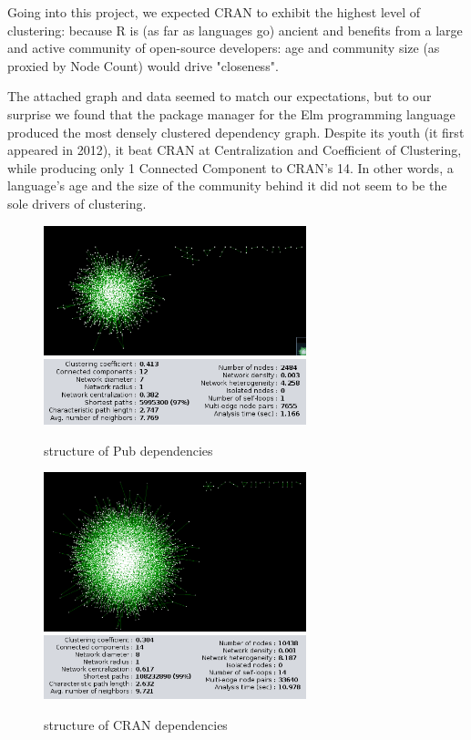 \documentclass[letterpaper, 10 pt, conference]{ieeeconf}  %
\begin{document}
Going into this project, we expected CRAN to exhibit the highest level of clustering:
	because R is (as far as languages go) ancient
    and benefits from a large and active community of open-source developers: 
    age and community size (as proxied by Node Count) would drive "closeness".

The attached graph and data seemed to match our expectations, 
	but to our surprise we found that the package manager for the Elm programming language 
	produced the most densely clustered dependency graph. 
    Despite its youth (it first appeared in 2012),
    it beat CRAN at Centralization and Coefficient of Clustering, 
    while producing only 1 Connected Component to CRAN's 14.
    In other words, a language's age and the size of the community behind it
    did not seem to be the sole drivers of clustering.

\begin{figure} %
\centering
\includegraphics[width=3in]{images/Pub_Graph.png}
\includegraphics[width=3in]{images/Pub_Params_Screenshot.png}
\caption{\label{Pub_Graph} structure of Pub dependencies}
\end{figure}

\begin{figure} %
\centering
\includegraphics[width=3in]{images/CRAN_Graph.png}
\includegraphics[width=3in]{images/CRAN_Params_Screenshot.png}
\caption{\label{CRAN} structure of CRAN dependencies}
\end{figure}
\end{document}
